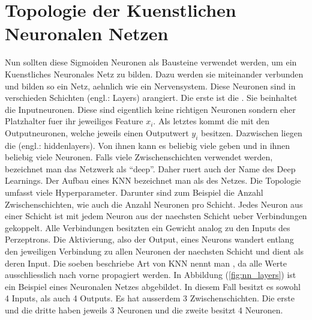 \section{Topologie der Kuenstlichen Neuronalen Netzen}
Nun sollten diese Sigmoiden Neuronen als Bausteine verwendet werden, um ein Kuenstliches
Neuronales Netz zu bilden. Dazu werden sie miteinander verbunden und bilden so ein Netz,
aehnlich wie ein Nervensystem.
\para{}
Diese Neuronen sind in verschieden Schichten (engl.: Layers)
arangiert. Die erste ist die . Sie beinhaltet die
Inputneuronen. Diese sind eigentlich keine richtigen
Neuronen sondern eher Platzhalter fuer ihr jeweiliges Feature $x_i$. Als letztes kommt die
 mit den Outputneuronen, welche jeweils einen Outputwert $y_i$
besitzen. Dazwischen liegen die  (engl.: hiddenlayers). Von ihnen kann es
beliebig viele geben und in ihnen beliebig viele Neuronen.
Falls viele Zwischenschichten verwendet werden, bezeichnet man das Netzwerk als
``deep''. Daher ruert auch der Name des Deep Learnings.
Der Aufbau eines KNN bezeichnet man als  des Netzes. Die
Topologie umfasst viele Hyperparameter. Darunter sind zum Beispiel die Anzahl Zwischenschichten, wie auch
die Anzahl Neuronen pro Schicht.
\para{}
Jedes Neuron aus einer Schicht ist mit jedem Neuron aus der naechsten Schicht ueber
Verbindungen gekoppelt. Alle Verbindungen besitzten ein Gewicht analog zu den Inputs des
Perzeptrons. Die Aktivierung, also der Output, eines Neurons wandert entlang den jeweiligen
Verbindung zu allen Neuronen der naechsten Schicht und dient als deren Input.
Die soeben beschriebe Art von KNN nennt man , da alle Werte
ausschliesslich nach vorne propagiert werden.
\para{}
In Abbildung (\ref{fig:nn_layers}) ist ein Beispiel eines Neuronalen Netzes
abgebildet. In diesem Fall besitzt es sowohl 4 Inputs, als auch 4 Outputs. Es hat
ausserdem 3 Zwischenschichten. Die erste und die dritte haben jeweils 3 Neuronen
und die zweite besitzt 4 Neuronen. \\

